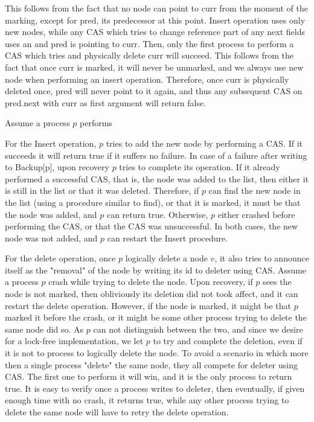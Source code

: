 This follows from the fact that no node can point to curr from the moment of the marking, except for pred, its predecessor at this point. Insert operation uses only new nodes, while any CAS which tries to change reference part of any next fields uses an 
and pred is pointing to curr. Then, only the first process to perform a CAS which tries and physically delete curr will succeed. This follows from the fact that once curr is marked, it will never be unmarked, and we always use new node when performing an insert operation. Therefore, once curr is physically deleted once, pred will never point to it again, and thus any subsequent CAS on pred.next with curr as first argument will return false.

Assume a process $p$ performs 

For the Insert operation, $p$ tries to add the new node by performing a CAS. If it succeeds it will return true if it suffers no failure. In case of a failure after writing to Backup[p], upon recovery $p$ tries to complete its operation. If it already performed a successful CAS, that is, the node was added to the list, then either it is still in the list or that it was deleted. Therefore, if $p$ can find the new node in the list (using a procedure similar to find), or that it is marked, it must be that the node was added, and $p$ can return true. Otherwise, $p$ either crashed before performing the CAS, or that the CAS was unsuccessful. In both cases, the new node was not added, and $p$ can restart the Insert procedure.

For the delete operation, once $p$ logically delete a node $v$, it also tries to announce itself as the "removal" of the node by writing its id to deleter using CAS. Assume a process $p$ crash while trying to delete the node. Upon recovery, if $p$ sees the node is not marked, then obliviously its deletion did not took affect, and it can restart the delete operation. However, if the node is marked, it might be that $p$ marked it before the crash, or it might be some other process trying to delete the same node did so. As $p$ can not distinguish between the two, and since we desire for a lock-free implementation, we let $p$ to try and complete the deletion, even if it is not to process to logically delete the node. To avoid a scenario in which more then a single process "delete" the same node, they all compete for deleter using CAS. The first one to perform it will win, and it is the only process to return true. It is easy to verify once a process writes to deleter, then eventually, if given enough time with no crash, it returns true, while any other process trying to delete the same node will have to retry the delete operation.

 
